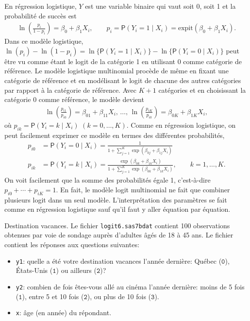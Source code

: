 \documentclass[
  11pt,
  letterpaper,
]{book}
\providecommand{\tightlist}{%
  \setlength{\itemsep}{0pt}\setlength{\parskip}{0pt}}
\theoremstyle{definition}
\theoremstyle{definition}
\theoremstyle{definition}
\theoremstyle{definition}
\theoremstyle{remark}
\begin{document}
En régression logistique, \(Y\) est une variable binaire qui vaut soit 0, soit 1 et la probabilité de succès est
\begin{align*}
\ln\left(\frac{p_i}{1-p_i}\right) = \beta_0 + \beta_1 X_{i}, \qquad p_i = {\mathsf P}\left(Y_i=1 \mid X_i\right) = \mathrm{expit}(\beta_0 + \beta_1X_i).
\end{align*}
Dans ce modèle logistique, \(\ln(p_i)-\ln(1-p_i) = \ln\{{\mathsf P}\left(Y_i=1 \mid X_i\right)\} - \ln\{{\mathsf P}\left(Y_i=0 \mid X_i\right)\}\) peut être vu comme étant le logit de la catégorie 1 en utilisant 0 comme catégorie de référence.
Le modèle logistique multinomial procède de même en fixant une catégorie de référence et en modélisant le logit de chacune des autres catégories par rapport à la catégorie de référence. Avec \(K+1\) catégories et en choisissant la catégorie 0 comme référence, le modèle devient
\begin{align*}
 \ln\left(\frac{p_{i1}}{p_{i0}}\right) = \beta_{01} + \beta_{11} X_i, \, \ldots, \, \ln\left(\frac{p_{iK}}{p_{i0}}\right) = \beta_{0K} + \beta_{1K} X_i,
\end{align*}
où \(p_{ik} = {\mathsf P}\left(Y_i=k \mid X_i\right)\) \((k=0, \ldots, K)\). Comme en régression logistique, on peut facilement exprimer ce modèle en termes des différentes probabilités,
\begin{align*}
 p_{i0} &= {\mathsf P}\left(Y_i=0 \mid X_i\right) = \frac{1}{1+ \sum_{j=1}^K\exp(\beta_{0j}+\beta_{1j}X_i)}\\
 p_{ik} &= {\mathsf P}\left(Y_i=k \mid X_i\right) = \frac{\exp(\beta_{0k}+\beta_{1k}X_i)}{1+ \sum_{j=1}^K\exp(\beta_{0k}+\beta_{1k}X_i)}, \qquad k =1, \ldots, K.
\end{align*}
On voit facilement que la somme des probabilités égale 1, c'est-à-dire \(p_{i0} + \cdots + p_{iK} = 1\). En fait, le modèle logit multinomial ne fait que combiner plusieurs logit dans un seul modèle. L'interprétation des paramètres se fait comme en régression logistique sauf qu'il faut y aller équation par équation.

Destination vacances. Le fichier \texttt{logit6.sas7bdat} contient 100 observations obtenues par voie de sondage auprès d'adultes âgés de 18 à 45 ans. Le fichier contient les réponses aux questions suivantes:

\begin{itemize}
\tightlist
\item
  \texttt{y1}: quelle a été votre destination vacances l'année dernière: Québec (\(\texttt{0}\)), États-Unis (\(\texttt{1}\)) ou ailleurs (\(\texttt{2}\))?
\item
  \texttt{y2}: combien de fois êtes-vous allé au cinéma l'année dernière: moins de 5 fois (\(\texttt{1}\)), entre 5 et 10 fois (\(\texttt{2}\)), ou plus de 10 fois (\(\texttt{3}\)).
\item
  \texttt{x}: âge (en année) du répondant.
\end{itemize}
\end{document}
